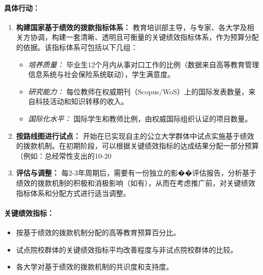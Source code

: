 \paragraph{具体行动：}
\begin{enumerate}
    \item \textbf{构建国家基于绩效的拨款指标体系：} 教育培训部主导，与专家、各大学及相关方协调，构建一套清晰、透明且可衡量的关键绩效指标体系，作为预算分配的依据。该指标体系可包括以下几组：
        \begin{itemize}
            \item \textit{培养质量：} 毕业生12个月内从事对口工作的比例（数据来自高等教育管理信息系统与社会保险系统联动），学生满意度。
            \item \textit{研究能力：} 每位教师在权威期刊（Scopus/WoS）上的国际发表数量，来自科技活动和知识转移的收入。
            \item \textit{国际化水平：} 国际学生和教师比例，由权威国际组织认证的项目数量。
        \end{itemize}
    \item \textbf{按路线图进行试点：} 开始在已实现自主的公立大学群体中试点实施基于绩效的拨款机制。在初期阶段，可以根据关键绩效指标的达成结果分配一部分预算（例如：总经常性支出的10-20%
    \item \textbf{评估与调整：} 每2-3年周期后，需要有一份独立的影��评估报告，分析基于绩效的拨款机制的积极和消极影响（如有），从而在考虑推广前，对关键绩效指标体系和分配方式进行适当调整。
\end{enumerate}

\paragraph{关键绩效指标：}
\begin{itemize}
    \item 按基于绩效的拨款机制分配的高等教育预算百分比。
    \item 试点院校群体的关键绩效指标平均改善程度与非试点院校群体的比较。
    \item 各大学对基于绩效的拨款机制的共识度和支持度。
\end{itemize}


















